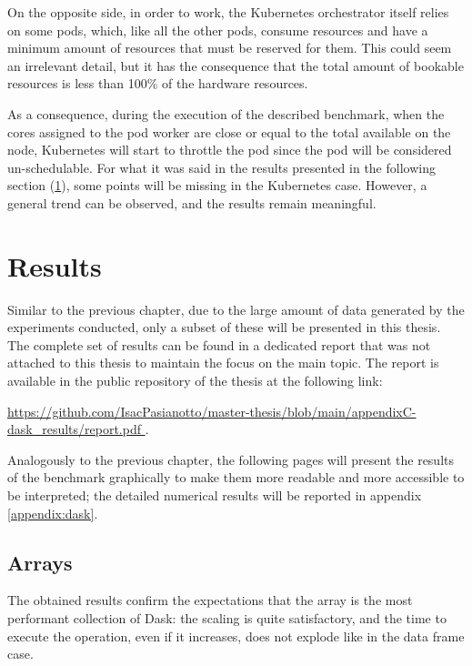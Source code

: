 On the opposite side, in order to work, the Kubernetes orchestrator itself
relies on some pods, which, like all the other pods, consume resources and have
a minimum amount of resources that must be reserved for them.
This could seem an irrelevant detail, but it has the consequence that the total
amount of bookable resources is less than 100\% of the hardware resources.

As a consequence, during the execution of the described benchmark, when the
cores assigned to the pod worker are close or equal to the total available on
the node, Kubernetes will start to throttle the pod since the pod will be
considered un-schedulable.
For what it was said in the results presented in the following section
(\ref{sec:daskresults}), some points will be missing in the Kubernetes case.
However, a general trend can be observed, and the results remain meaningful.

\section{Results}\label{sec:daskresults}

Similar to the previous chapter, due to the large amount of data generated by
the experiments conducted, only a subset of these will be presented in this
thesis.
The complete set of results can be found in a dedicated report that was not
attached to this thesis to maintain the focus on the main topic.
The report is available in the public repository of the thesis at the following
link:

\begin{center}
  \small
  \url{
    https://github.com/IsacPasianotto/master-thesis/blob/main/appendixC-dask_results/report.pdf
  }.
\end{center}

Analogously to the previous chapter, the following pages will present the
results of the benchmark graphically to make them more readable and more
accessible to be interpreted; the detailed numerical results will be reported in
appendix \ref{appendix:dask}.

\subsection{Arrays}

The obtained results confirm the expectations that the array is the most
performant collection of Dask: the scaling is quite satisfactory, and the time
to execute the operation, even if it increases, does not explode like in the
data frame case.

